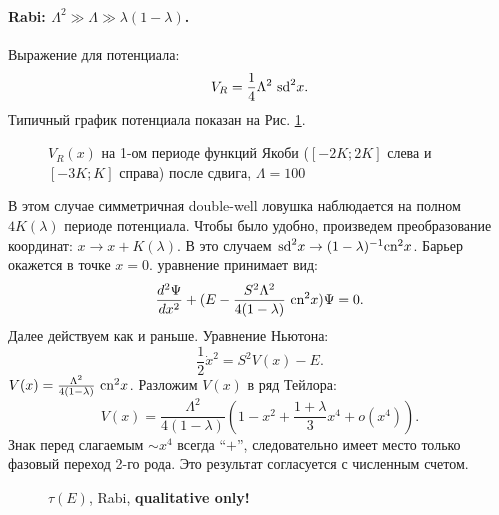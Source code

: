 \documentclass[12pt]{article}
\begin{document}
\paragraph{Rabi: $\Lambda^2 \gg \Lambda \gg \lambda(1 - \lambda)$.}
Выражение для потенциала:
%
\begin{equation}
V_R = \frac{1}{4} \Lambda^2 ~\textrm{sd}^2 x.
\end{equation}
%
Типичный график потенциала показан на Рис. \ref{pic:potential_rabi}.
%
\begin{figure}[Ht!]
\caption{$V_R (x)$ на 1-ом периоде функций Якоби ($[-2K; 2K]$ слева и $[-3K; K]$ справа) после сдвига, $\Lambda = 100$}
\label{pic:potential_rabi}
\end{figure}
%
В этом случае симметричная double-well ловушка наблюдается на полном $4K(\lambda)$ периоде потенциала.
Чтобы было удобно, произведем преобразование координат: $x \to x + K(\lambda)$.
В это случаем $\textrm{sd}^2 x \to (1 - \lambda)^{-1} \textrm{cn}^2 x$.
Барьер окажется в точке $x = 0$.
уравнение принимает вид:
%
\begin{equation}
\frac{d^2 \Psi}{dx^2} + (E - \frac{S^2 \Lambda^2}{4 (1 - \lambda)} ~\textrm{cn}^2 x) \Psi = 0.
\end{equation}
%
Далее действуем как и раньше.
Уравнение Ньютона:
%
\begin{equation}
\frac{1}{2} \dot{x}^2 = S^2 V(x) - E.
\end{equation}
%
$V(x) = \frac{\Lambda^2}{4(1 - \lambda)} ~\textrm{cn}^2 x$.
Разложим $V(x)$ в ряд Тейлора:
%
\begin{equation}
V(x) = \frac{\Lambda^2}{4(1 - \lambda)} (1 - x^2 + \frac{1 + \lambda}{3} x^4 + o(x^4)).
\end{equation}
%
Знак перед слагаемым $\sim x^4$ всегда ``$+$'', следовательно имеет место только фазовый переход 2-го рода.
Это результат согласуется с численным счетом.
%
\begin{figure}[Ht!]
\caption{$\tau(E)$, Rabi, {\bf qualitative only!}}
\end{figure}
%
\end{document}
